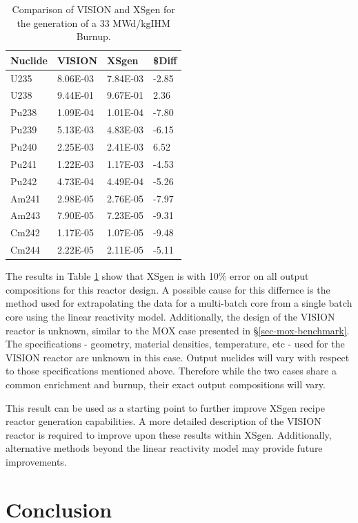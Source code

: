 \documentclass{article}
\begin{document}
\begin{table}[!htb]
\centering
\caption{Comparison of VISION and XSgen for the generation of a 33 MWd/kgIHM Burnup.}
\label{tab:recipe}
\begin{tabular}{llll}
Nuclide & VISION & XSgen & \$Diff \\
\hline
U235 & 8.06E-03 & 7.84E-03 & -2.85 \\
U238 & 9.44E-01 & 9.67E-01 & 2.36 \\
Pu238 & 1.09E-04 & 1.01E-04 & -7.80 \\
Pu239 & 5.13E-03 & 4.83E-03 & -6.15 \\
Pu240 & 2.25E-03 & 2.41E-03 & 6.52 \\
Pu241 & 1.22E-03 & 1.17E-03 & -4.53 \\
Pu242 & 4.73E-04 & 4.49E-04 & -5.26 \\
Am241 & 2.98E-05 & 2.76E-05 & -7.97 \\
Am243 & 7.90E-05 & 7.23E-05 & -9.31 \\
Cm242 & 1.17E-05 & 1.07E-05 & -9.48 \\
Cm244 & 2.22E-05 & 2.11E-05 & -5.11 \\
\end{tabular}
\end{table}

The results in Table \ref{tab:recipe} show that XSgen is with 10\% error on all output
compositions for this reactor design. A possible cause for this differnce is the
method used for extrapolating the data for a multi-batch core from a single batch core using
the linear reactivity model. Additionally, the design of the VISION reactor is unknown, similar to the MOX case presented
in \S\ref{sec-mox-benchmark}. The specifications - geometry, material densities, temperature, etc - used for the VISION reactor
are unknown in this case. Output nuclides will vary with respect to those specifications mentioned above. Therefore while
the two cases share a common enrichment and burnup, their exact output compositions will vary. 

This result can be used as a starting point to further improve XSgen recipe reactor generation capabilities. A more detailed 
description of the VISION reactor is required to improve upon these results within XSgen. Additionally, alternative methods 
beyond the linear reactivity model\cite{linear} may provide future improvements.

\section{Conclusion}
\end{document}
